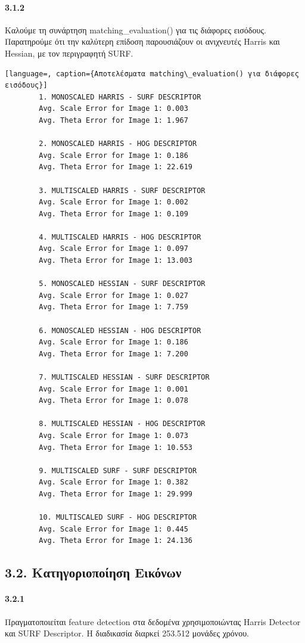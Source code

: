 \documentclass[]{article}
\begin{document}
	\paragraph{3.1.2} Καλούμε τη συνάρτηση matching\_evaluation() για τις διάφορες εισόδους. Παρατηρούμε ότι την καλύτερη επίδοση παρουσιάζουν οι ανιχνευτές Harris και Hessian, με τον περιγραφητή SURF.
	
	\begin{lstlisting}[language=, caption={Αποτελέσματα matching\_evaluation() για διάφορες εισόδους}]
		1. MONOSCALED HARRIS - SURF DESCRIPTOR
		Avg. Scale Error for Image 1: 0.003
		Avg. Theta Error for Image 1: 1.967
		
		2. MONOSCALED HARRIS - HOG DESCRIPTOR
		Avg. Scale Error for Image 1: 0.186
		Avg. Theta Error for Image 1: 22.619
		
		3. MULTISCALED HARRIS - SURF DESCRIPTOR
		Avg. Scale Error for Image 1: 0.002
		Avg. Theta Error for Image 1: 0.109
		
		4. MULTISCALED HARRIS - HOG DESCRIPTOR
		Avg. Scale Error for Image 1: 0.097
		Avg. Theta Error for Image 1: 13.003
		
		5. MONOSCALED HESSIAN - SURF DESCRIPTOR
		Avg. Scale Error for Image 1: 0.027
		Avg. Theta Error for Image 1: 7.759
		
		6. MONOSCALED HESSIAN - HOG DESCRIPTOR
		Avg. Scale Error for Image 1: 0.186
		Avg. Theta Error for Image 1: 7.200
		
		7. MULTISCALED HESSIAN - SURF DESCRIPTOR
		Avg. Scale Error for Image 1: 0.001
		Avg. Theta Error for Image 1: 0.078
		
		8. MULTISCALED HESSIAN - HOG DESCRIPTOR
		Avg. Scale Error for Image 1: 0.073
		Avg. Theta Error for Image 1: 10.553
		
		9. MULTISCALED SURF - SURF DESCRIPTOR
		Avg. Scale Error for Image 1: 0.382
		Avg. Theta Error for Image 1: 29.999
		
		10. MULTISCALED SURF - HOG DESCRIPTOR
		Avg. Scale Error for Image 1: 0.445
		Avg. Theta Error for Image 1: 24.136
	\end{lstlisting}
	
	\subsection*{3.2. Κατηγοριοποίηση Εικόνων}
	\paragraph{3.2.1 } Πραγματοποιείται feature detection στα δεδομένα χρησιμοποιώντας Harris Detector και SURF Descriptor. Η διαδικασία διαρκεί 253.512 μονάδες χρόνου.
\end{document}
